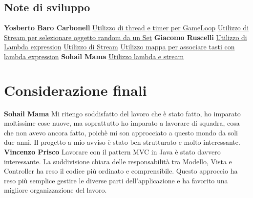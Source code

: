 \documentclass[a4paper,12pt]{report}
\begin{document}
\section{Note di sviluppo}
\textbf{Yosberto Baro Carbonell}\newline
\href{https://github.com/Carbocode/OOP23-Breakout/blob/5098fbc11d7a6030a018341082738afb8926974c/src/main/java/it/unibo/controller/GameLoop.java\#L148}{Utilizzo di thread e timer per GameLoop}\newline
\href{https://github.com/Carbocode/OOP23-Breakout/blob/5098fbc11d7a6030a018341082738afb8926974c/src/test/java/it/unibo/api/CollisionManagerTest.java\#L89}{Utilizzo di Stream per selezionare oggetto random da un Set}\newline
\newline
\textbf{Giacomo Ruscelli}\newline
\href{https://github.com/Carbocode/OOP23-Breakout/blob/69327514cd4e3f224d6867c94b9345083c8b08f5/src/main/java/it/unibo/model/Bar.java\#L130}{Utilizzo di Lambda expression}\newline
\href{https://github.com/Carbocode/OOP23-Breakout/blob/69327514cd4e3f224d6867c94b9345083c8b08f5/src/main/java/it/unibo/model/ScoreboardImpl.java\#L98}{Utilizzo di Stream}\newline
\href{https://github.com/Carbocode/OOP23-Breakout/blob/69327514cd4e3f224d6867c94b9345083c8b08f5/src/main/java/it/unibo/model/Bar.java\#L36}{Utilizzo mappa per associare tasti con lambda expression}
\newline
\newline
\textbf{Sohail Mama}\newline
\href{https://github.com/Carbocode/OOP23-Breakout/blob/4f84e369afabdf19194b28f7ea207b114760d0c7/src/main/java/it/unibo/view/GameView.java#L153}{Utilizzo lambda e stream}

\chapter{Considerazione finali}
\textbf{Sohail Mama}\newline
Mi ritengo soddisfatto del lavoro che è stato fatto, ho imparato moltissime cose nuove, ma soprattutto ho imparato a lavorare di squadra, cosa che non avevo ancora fatto, poichè mi son approcciato a questo mondo da soli due anni.\newline
Il progetto a mio avviso è stato ben strutturato e molto interessante.\newline\newline
\textbf{Vincenzo Prisco}\newline
Lavorare con il pattern MVC in Java è stato davvero interessante. La suddivisione chiara delle responsabilità tra Modello, Vista e Controller ha reso il codice più ordinato e comprensibile. Questo approccio ha reso più semplice gestire le diverse parti dell'applicazione e ha favorito una migliore organizzazione del lavoro.\newline
\end{document}

